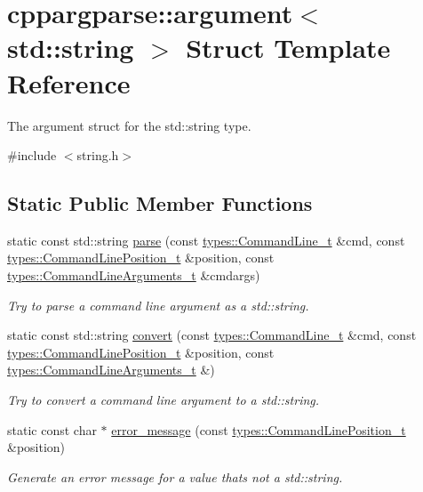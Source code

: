 \hypertarget{structcppargparse_1_1argument_3_01std_1_1string_01_4}{}\section{cppargparse\+:\+:argument$<$ std\+:\+:string $>$ Struct Template Reference}
\label{structcppargparse_1_1argument_3_01std_1_1string_01_4}


The argument struct for the std\+::string type.  




{\ttfamily \#include $<$string.\+h$>$}

\subsection*{Static Public Member Functions}
\begin{DoxyCompactItemize}
\item 
static const std\+::string \hyperlink{structcppargparse_1_1argument_3_01std_1_1string_01_4_af0b5a5adbfd58ee818f46f5d42f6f36d}{parse} (const \hyperlink{types_8h_a80adf2418b7ce9fe616698efa7533ecf}{types\+::\+Command\+Line\+\_\+t} \&cmd, const \hyperlink{types_8h_a43b4f43f8940de1bf09ced6f1b668053}{types\+::\+Command\+Line\+Position\+\_\+t} \&position, const \hyperlink{types_8h_a003c660afe2ee9c6cc39aea966e8926d}{types\+::\+Command\+Line\+Arguments\+\_\+t} \&cmdargs)
\begin{DoxyCompactList}\small\item\em Try to parse a command line argument as a std\+::string. \end{DoxyCompactList}\item 
static const std\+::string \hyperlink{structcppargparse_1_1argument_3_01std_1_1string_01_4_aa54c1d7414d89a1071bb7cdb07be0b00}{convert} (const \hyperlink{types_8h_a80adf2418b7ce9fe616698efa7533ecf}{types\+::\+Command\+Line\+\_\+t} \&cmd, const \hyperlink{types_8h_a43b4f43f8940de1bf09ced6f1b668053}{types\+::\+Command\+Line\+Position\+\_\+t} \&position, const \hyperlink{types_8h_a003c660afe2ee9c6cc39aea966e8926d}{types\+::\+Command\+Line\+Arguments\+\_\+t} \&)
\begin{DoxyCompactList}\small\item\em Try to convert a command line argument to a std\+::string. \end{DoxyCompactList}\item 
static const char $\ast$ \hyperlink{structcppargparse_1_1argument_3_01std_1_1string_01_4_abf0e56694e3cb65b632759217de194f1}{error\+\_\+message} (const \hyperlink{types_8h_a43b4f43f8940de1bf09ced6f1b668053}{types\+::\+Command\+Line\+Position\+\_\+t} \&position)
\begin{DoxyCompactList}\small\item\em Generate an error message for a value that\textquotesingle{}s not a std\+::string. \end{DoxyCompactList}\end{DoxyCompactItemize}


